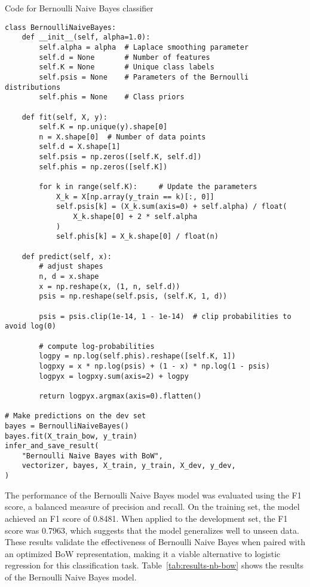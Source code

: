 \documentclass{article}
\begin{document}
\begin{listing}[H]
\caption{Code for Bernoulli Naive Bayes classifier}
\label{code:naive-bayes}
\begin{verbatim}
class BernoulliNaiveBayes:
    def __init__(self, alpha=1.0):
        self.alpha = alpha  # Laplace smoothing parameter
        self.d = None       # Number of features
        self.K = None       # Unique class labels
        self.psis = None    # Parameters of the Bernoulli distributions
        self.phis = None    # Class priors

    def fit(self, X, y):
        self.K = np.unique(y).shape[0]
        n = X.shape[0]  # Number of data points
        self.d = X.shape[1]
        self.psis = np.zeros([self.K, self.d])
        self.phis = np.zeros([self.K])

        for k in range(self.K):     # Update the parameters
            X_k = X[np.array(y_train == k)[:, 0]]
            self.psis[k] = (X_k.sum(axis=0) + self.alpha) / float(
                X_k.shape[0] + 2 * self.alpha
            )
            self.phis[k] = X_k.shape[0] / float(n)

    def predict(self, x):
        # adjust shapes
        n, d = x.shape
        x = np.reshape(x, (1, n, self.d))
        psis = np.reshape(self.psis, (self.K, 1, d))

        psis = psis.clip(1e-14, 1 - 1e-14)  # clip probabilities to avoid log(0)

        # compute log-probabilities
        logpy = np.log(self.phis).reshape([self.K, 1])
        logpxy = x * np.log(psis) + (1 - x) * np.log(1 - psis)
        logpyx = logpxy.sum(axis=2) + logpy

        return logpyx.argmax(axis=0).flatten()

# Make predictions on the dev set
bayes = BernoulliNaiveBayes()
bayes.fit(X_train_bow, y_train)
infer_and_save_result(
    "Bernoulli Naive Bayes with BoW",
    vectorizer, bayes, X_train, y_train, X_dev, y_dev,
)
\end{verbatim}
\end{listing}

The performance of the Bernoulli Naive Bayes model was evaluated using the F1 score, a balanced measure of precision and recall. On the training set, the model achieved an F1 score of 0.8481. When applied to the development set, the F1 score was 0.7963, which suggests that the model generalizes well to unseen data. These results validate the effectiveness of Bernoulli Naive Bayes when paired with an optimized BoW representation, making it a viable alternative to logistic regression for this classification task. Table~\ref{tab:results-nb-bow} shows the results of the Bernoulli Naive Bayes model.
\end{document}
